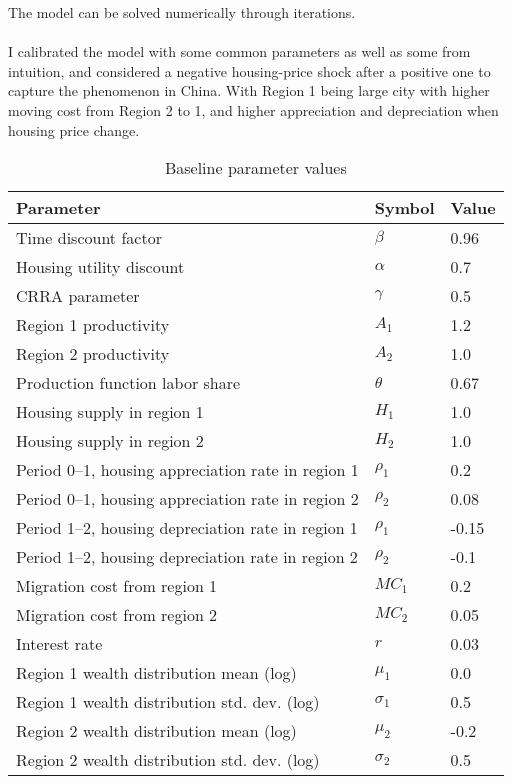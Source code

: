 \documentclass[12pt,letterpaper]{article}
\begin{document}
	The model can be solved numerically through iterations.\smallskip\\
	\smallskip\\
	I calibrated the model with {\color{red}some common parameters as well as some from intuition}, and considered a negative housing-price shock after a positive one to capture the phenomenon in China. With Region 1 being large city with higher moving cost from Region 2 to 1, and higher appreciation and depreciation when housing price change.
	
	\begin{table}[ht]
		\centering
		\begin{tabular}{lll}
			\toprule
			Parameter & Symbol & Value \\
			\midrule
			Time discount factor & $\beta$ & 0.96 \\
			Housing utility discount & $\alpha$ & 0.7 \\
			CRRA parameter & $\gamma$ & 0.5 \\
			Region 1 productivity & $A_1$ & 1.2 \\
			Region 2 productivity & $A_2$ & 1.0 \\
			Production function labor share & $\theta$ & 0.67 \\
			Housing supply in region 1 & $H_1$ & 1.0 \\
			Housing supply in region 2 & $H_2$ & 1.0 \\
			Period 0--1, housing appreciation rate in region 1 & $\rho_1$ & 0.2 \\
			Period 0--1, housing appreciation rate in region 2 & $\rho_2$ & 0.08 \\
			Period 1--2, housing depreciation rate in region 1 & $\rho_1$ & -0.15 \\
			Period 1--2, housing depreciation rate in region 2 & $\rho_2$ & -0.1 \\
			Migration cost from region 1 & $MC_1$ & 0.2\\
			Migration cost from region 2 & $MC_2$ & 0.05\\
			Interest rate & $r$ & 0.03 \\
			Region 1 wealth distribution mean (log) & $\mu_1$ & 0.0 \\
			Region 1 wealth distribution std. dev. (log) & $\sigma_1$ & 0.5 \\
			Region 2 wealth distribution mean (log) & $\mu_2$ & -0.2 \\
			Region 2 wealth distribution std. dev. (log) & $\sigma_2$ & 0.5 \\
			\bottomrule
		\end{tabular}
		\caption{Baseline parameter values}
		\label{tab:parameters}
	\end{table}
\end{document}
